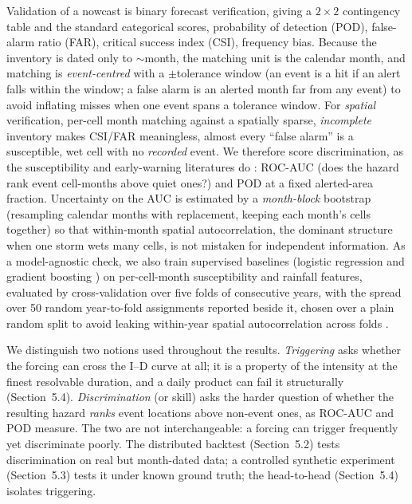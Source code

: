 \documentclass[authoryear,preprint,review,12pt]{elsarticle}
\begin{document}
Validation of a nowcast is binary forecast verification, giving a $2\times2$
contingency table and the standard categorical scores, probability of detection
(POD), false-alarm ratio (FAR), critical success index (CSI), frequency bias.
Because the inventory is dated only to $\sim$month, the matching unit is the
calendar month, and matching is \emph{event-centred} with a $\pm$tolerance window
(an event is a hit if an alert falls within the window; a false alarm is an
alerted month far from any event) to avoid inflating misses when one event spans
a tolerance window. For \emph{spatial} verification, per-cell month matching
against a spatially sparse, \emph{incomplete} inventory makes CSI/FAR
meaningless, almost every ``false alarm'' is a susceptible, wet cell with no
\emph{recorded} event. We therefore score discrimination, as the susceptibility
and early-warning literatures do \citep{reichenbach2018}: ROC-AUC \citep{hanley1982} (does the hazard
rank event cell-months above quiet ones?) and POD at a fixed alerted-area
fraction. Uncertainty on the AUC is estimated by a \emph{month-block} bootstrap
(resampling calendar months with replacement, keeping each month's cells
together) so that within-month spatial autocorrelation, the dominant structure
when one storm wets many cells, is not mistaken for independent information. As a
model-agnostic check, we also train supervised baselines (logistic regression and
gradient boosting \citep{friedman2001}) on per-cell-month susceptibility and rainfall features,
evaluated by cross-validation over five folds of consecutive years, with the
spread over 50 random year-to-fold assignments reported beside it, chosen over a
plain random split to avoid leaking within-year spatial autocorrelation across
folds \citep{roberts2016}.

We distinguish two notions used throughout the results. \emph{Triggering} asks
whether the forcing can cross the I--D curve at all; it is a property of the
intensity at the finest resolvable duration, and a daily product can fail it
structurally (Section~5.4). \emph{Discrimination} (or skill) asks the harder
question of whether the resulting hazard \emph{ranks} event locations above
non-event ones, as ROC-AUC and POD measure. The two are not interchangeable: a
forcing can trigger frequently yet discriminate poorly. The distributed backtest
(Section~5.2) tests discrimination on real but month-dated data; a controlled
synthetic experiment (Section~5.3) tests it under known ground truth; the
head-to-head (Section~5.4) isolates triggering.
\end{document}
